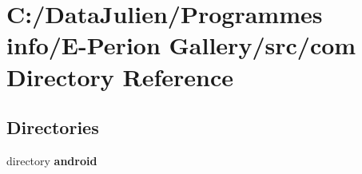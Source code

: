 \section{C\-:/\-Data\-Julien/\-Programmes info/\-E-\/\-Perion Gallery/src/com Directory Reference}
\label{dir_541eb0a6c58a7690acc5b848a4b1b724}
\subsection*{Directories}
\begin{DoxyCompactItemize}
\item 
directory {\bf android}
\end{DoxyCompactItemize}

